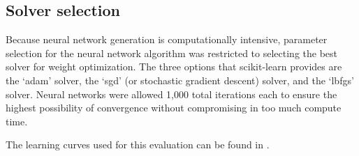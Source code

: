 \documentclass{article}
\begin{document}
    \subsection{Solver selection}
    Because neural network generation is computationally intensive, parameter selection for the neural network algorithm was restricted to selecting the best solver for weight optimization. The three options that scikit-learn provides are the `adam' solver, the `sgd' (or stochastic gradient descent) solver, and the `lbfgs' solver. Neural networks were allowed 1,000 total iterations each to ensure the highest possibility of convergence without compromising in too much compute time.

    The learning curves used for this evaluation can be found in .

    \begin{figure}[htb]
    \centering


\end{figure}
\end{document}
